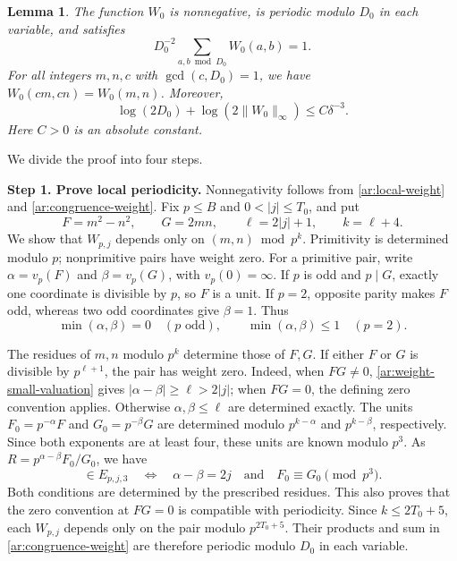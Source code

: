 \documentclass[twoside]{aomart}
\makeatletter
\theoremstyle{paperplain}
\newtheorem{lemma}[theorem]{Lemma}
\theoremstyle{paperdefinition}
\renewenvironment{proof}[1][\proofname]{\par\pushQED{\qed}%
  \normalfont\topsep6\p@\@plus3\p@\relax\trivlist
  \item[\hskip\labelsep\itshape #1\@addpunct{.}]\ignorespaces
}{\popQED\endtrivlist\@endpefalse}
\numberwithin{equation}{section}
\makeatother
\begin{document}
\begin{lemma}
\label{ar:weight-cost}
The function $W_0$ is nonnegative, is periodic modulo $D_0$ in
each variable, and satisfies
\begin{equation*}
 D_0^{-2}\sum_{a,b\bmod D_0}W_0(a,b)=1.
\end{equation*}
For all integers $m,n,c$ with $\gcd(c,D_0)=1$, we have
$W_0(cm,cn)=W_0(m,n)$. Moreover,
\begin{equation}
 \log(2D_0)+\log(2\|W_0\|_\infty)\le C\delta^{-3}.
 \label{ar:weight-size}
\end{equation}
Here $C>0$ is an absolute constant.
\end{lemma}
\begin{proof}
We divide the proof into four steps.

\medskip
\noindent\textbf{Step 1. Prove local periodicity.}
Nonnegativity follows from \eqref{ar:local-weight} and
\eqref{ar:congruence-weight}. Fix $p\le B$ and $0<|j|\le T_0$,
and put
\begin{equation*}
 F=m^2-n^2,\qquad G=2mn,\qquad
 \ell=2|j|+1,\qquad k=\ell+4.
\end{equation*}
We show that $W_{p,j}$ depends only on $(m,n)\bmod p^k$.
Primitivity is determined modulo $p$; nonprimitive pairs have
weight zero. For a primitive pair, write $\alpha=v_p(F)$ and
$\beta=v_p(G)$, with $v_p(0)=\infty$. If $p$ is odd and
$p\mid G$, exactly one coordinate is divisible by $p$, so
$F$ is a unit. If $p=2$, opposite parity makes $F$ odd,
whereas two odd coordinates give $\beta=1$. Thus
\begin{equation}
 \min(\alpha,\beta)=0\quad(p\text{ odd}),\qquad
 \min(\alpha,\beta)\le1\quad(p=2).
 \label{ar:weight-small-valuation}
\end{equation}

The residues of $m,n$ modulo $p^k$ determine those of $F,G$.
If either $F$ or $G$ is divisible by $p^{\ell+1}$, the pair
has weight zero. Indeed, when $FG\ne0$,
\eqref{ar:weight-small-valuation} gives
$|\alpha-\beta|\ge\ell>2|j|$; when $FG=0$, the defining
zero convention applies. Otherwise $\alpha,\beta\le\ell$
are determined exactly. The units $F_0=p^{-\alpha}F$ and
$G_0=p^{-\beta}G$ are determined modulo $p^{k-\alpha}$ and
$p^{k-\beta}$, respectively. Since both exponents are at
least four, these units are known modulo $p^3$. As
$R=p^{\alpha-\beta}F_0/G_0$, we have
\begin{equation*}
 [m:n]\in E_{p,j,3}
 \quad\Longleftrightarrow\quad
 \alpha-\beta=2j\quad\text{and}\quad F_0\equiv G_0\pmod{p^3}.
\end{equation*}
Both conditions are determined by the prescribed residues.
This also proves that the zero convention at $FG=0$ is
compatible with periodicity. Since $k\le2T_0+5$, each
$W_{p,j}$ depends only on the pair modulo $p^{2T_0+5}$.
Their products and sum in \eqref{ar:congruence-weight}
are therefore periodic modulo $D_0$ in each variable.


\end{proof}
\end{document}
